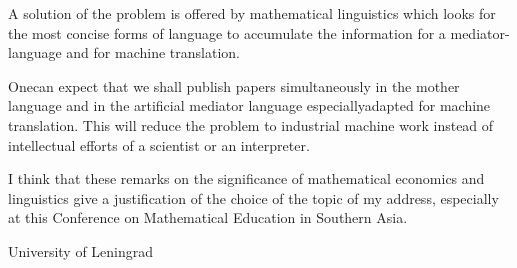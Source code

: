 A solution of the problem is offered by mathematical linguistics which
looks for the most concise forms of language to accumulate the
information for a mediator-language and for machine translation.

One\pageoriginale can expect that we shall publish papers
simultaneously in the mother language and in the artificial mediator
language especially\break adapted for machine translation. This will reduce
the problem to industrial machine work instead of intellectual efforts
of a scientist or an interpreter.

I think that these remarks on the significance of mathematical
economics and linguistics give a justification of the choice of the
topic of my address, especially at this Conference on Mathematical
Education in Southern Asia.

\bigskip
\bigskip

\noindent
{\fontsize{9pt}{11pt}\selectfont
University of Leningrad}\relax
